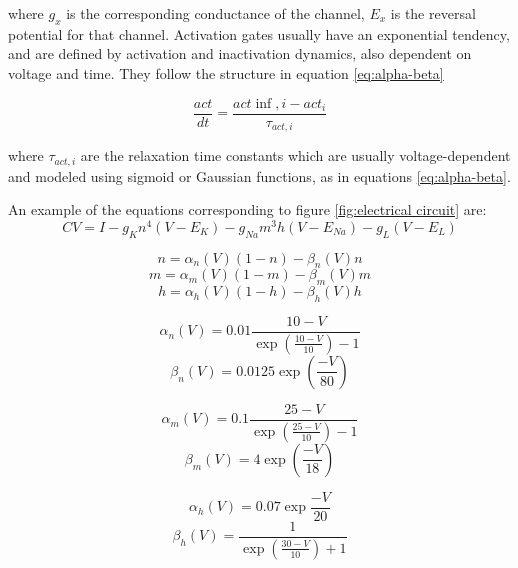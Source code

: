 where $g_x$ is the corresponding conductance of the channel, $E_x$ is the reversal potential for that channel.
Activation gates usually have an exponential tendency, and are defined by activation and inactivation dynamics, also dependent on voltage and time. They follow the structure in equation \ref{eq:alpha-beta}

\begin{equation}
	\label{eq:alpha-beta}
	\frac{act}{dt} = \frac{act{\inf,i}-act_i}{\tau_{act,i}}
\end{equation}

where $\tau_{act,i}$ are the relaxation time constants which are usually voltage-dependent and modeled using sigmoid or Gaussian functions, as in equations \ref{eq:alpha-beta}. 


 An example of the equations corresponding to figure \ref{fig:electrical circuit} are:
\begin{equation}
		C V = I - g_K n^4 (V - E_K) - g_{Na} m^3h(V-E_{Na}) - g_L (V-E_L)
\end{equation}

\begin{multicols}{2}
	\begin{equation}
		n = \alpha_n (V)(1-n)-\beta_n(V)n
	\end{equation}
	\begin{equation}
		m = \alpha_m (V)(1-m)-\beta_m(V)m
	\end{equation}
	\begin{equation}
		h = \alpha_h (V)(1-h)-\beta_h(V)h
	\end{equation}


	\begin{equation}
	\alpha_n(V)=0.01\frac{10-V}	{\exp(\frac{10-V}{10})-1}
	\end{equation}
	\begin{equation}
	\beta_n(V)=0.0125\exp(\frac{-V}{80})
	\end{equation}


\vspace{-15pt}
	\begin{equation}
		\alpha_m(V)=0.1\frac{25-V}{\exp(\frac{25-V}{10})-1}
	\end{equation}
	\begin{equation}
		\beta_m(V)=4\exp(\frac{-V}{18})
	\end{equation}

\vspace{-15pt}
	\begin{equation}
	\alpha_h(V)=0.07\exp\frac{-V}{20}
	\end{equation}
	\begin{equation}
		\beta_h(V)=\frac{1}{\exp(\frac{30-V}{10})+1}
	\end{equation}
\end{multicols}


